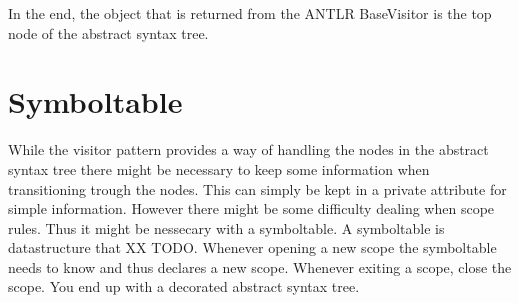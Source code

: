 In the end, the object that is returned from the ANTLR BaseVisitor is the top node of the abstract syntax tree.


\section{Symboltable}
While the visitor pattern provides a way of handling the nodes in the abstract syntax tree there might be necessary to keep some information when transitioning trough the nodes. This can simply be kept in a private attribute for simple information. However there might be some difficulty dealing when scope rules. Thus it might be nessecary with a symboltable.
A symboltable is datastructure that XX TODO. Whenever opening a new scope the symboltable needs to know and thus declares a new scope. Whenever exiting a scope, close the scope. 
You end up with a decorated abstract syntax tree.


